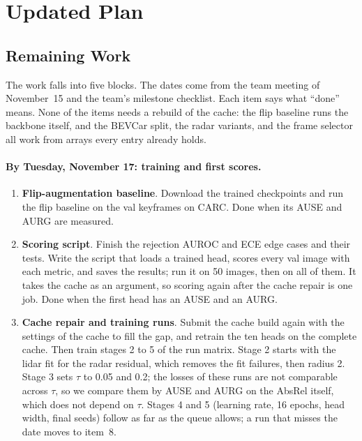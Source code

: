 \section{Updated Plan}
\label{sec:plan}

\subsection{Remaining Work}

The work falls into five blocks. The dates come from the team meeting of November~15 and the team's milestone checklist. Each item says what ``done'' means. None of the items needs a rebuild of the cache: the flip baseline runs the backbone itself, and the BEVCar split, the radar variants, and the frame selector all work from arrays every entry already holds.

\paragraph{By Tuesday, November 17: training and first scores.}
\begin{enumerate}[leftmargin=*, itemsep=2pt, topsep=2pt]
  \item \textbf{Flip-augmentation baseline}. Download the trained checkpoints and run the flip baseline on the val keyframes on CARC. Done when its AUSE and AURG are measured.
  \item \textbf{Scoring script}. Finish the rejection AUROC and ECE edge cases and their tests. Write the script that loads a trained head, scores every val image with each metric, and saves the results; run it on 50 images, then on all of them. It takes the cache as an argument, so scoring again after the cache repair is one job. Done when the first head has an AUSE and an AURG.
  \item \textbf{Cache repair and training runs}. Submit the cache build again with the settings of the cache to fill the gap, and retrain the ten heads on the complete cache. Then train stages 2 to 5 of the run matrix. Stage 2 starts with the lidar fit for the radar residual, which removes the fit failures, then radius 2. Stage 3 sets $\tau$ to 0.05 and 0.2; the losses of these runs are not comparable across $\tau$, so we compare them by AUSE and AURG on the AbsRel itself, which does not depend on $\tau$. Stages 4 and 5 (learning rate, 16 epochs, head width, final seeds) follow as far as the queue allows; a run that misses the date moves to item~8.
\end{enumerate}

